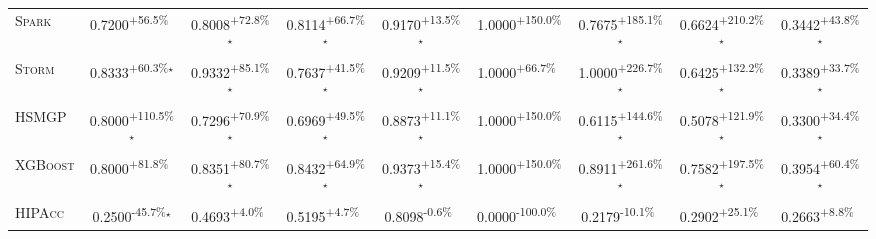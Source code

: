 \begin{table}[htbp]
\begin{tabular}{l|cccc|cccc}
\textsc{Spark} & \cellcolor{green!30}0.7200\textsuperscript{+56.5\%}$^{\,\,\,}$ & \cellcolor{green!30}0.8008\textsuperscript{+72.8\%}$^\star$ & \cellcolor{green!30}0.8114\textsuperscript{+66.7\%}$^\star$ & \cellcolor{green!30}0.9170\textsuperscript{+13.5\%}$^\star$ & \cellcolor{green!30}1.0000\textsuperscript{+150.0\%}$^{\,\,\,}$ & \cellcolor{green!30}0.7675\textsuperscript{+185.1\%}$^\star$ & \cellcolor{green!30}0.6624\textsuperscript{+210.2\%}$^\star$ & \cellcolor{green!30}0.3442\textsuperscript{+43.8\%}$^\star$ \\
\textsc{Storm} & \cellcolor{green!30}0.8333\textsuperscript{+60.3\%}$^\star$ & \cellcolor{green!30}0.9332\textsuperscript{+85.1\%}$^\star$ & \cellcolor{green!30}0.7637\textsuperscript{+41.5\%}$^\star$ & \cellcolor{green!30}0.9209\textsuperscript{+11.5\%}$^\star$ & \cellcolor{green!30}1.0000\textsuperscript{+66.7\%}$^{\,\,\,}$ & \cellcolor{green!30}1.0000\textsuperscript{+226.7\%}$^\star$ & \cellcolor{green!30}0.6425\textsuperscript{+132.2\%}$^\star$ & \cellcolor{green!30}0.3389\textsuperscript{+33.7\%}$^\star$ \\
\textsc{HSMGP} & \cellcolor{green!30}0.8000\textsuperscript{+110.5\%}$^\star$ & \cellcolor{green!30}0.7296\textsuperscript{+70.9\%}$^\star$ & \cellcolor{green!30}0.6969\textsuperscript{+49.5\%}$^\star$ & \cellcolor{green!30}0.8873\textsuperscript{+11.1\%}$^\star$ & \cellcolor{green!30}1.0000\textsuperscript{+150.0\%}$^{\,\,\,}$ & \cellcolor{green!30}0.6115\textsuperscript{+144.6\%}$^\star$ & \cellcolor{green!30}0.5078\textsuperscript{+121.9\%}$^\star$ & \cellcolor{green!30}0.3300\textsuperscript{+34.4\%}$^\star$ \\
\textsc{XGBoost} & \cellcolor{green!30}0.8000\textsuperscript{+81.8\%}$^{\,\,\,}$ & \cellcolor{green!30}0.8351\textsuperscript{+80.7\%}$^\star$ & \cellcolor{green!30}0.8432\textsuperscript{+64.9\%}$^\star$ & \cellcolor{green!30}0.9373\textsuperscript{+15.4\%}$^\star$ & \cellcolor{green!30}1.0000\textsuperscript{+150.0\%}$^{\,\,\,}$ & \cellcolor{green!30}0.8911\textsuperscript{+261.6\%}$^\star$ & \cellcolor{green!30}0.7582\textsuperscript{+197.5\%}$^\star$ & \cellcolor{green!30}0.3954\textsuperscript{+60.4\%}$^\star$ \\
\textsc{HIPAcc} & \cellcolor{red!30}0.2500\textsuperscript{-45.7\%}$^\star$ & \cellcolor{green!30}0.4693\textsuperscript{+4.0\%}$^{\,\,\,}$ & \cellcolor{green!30}0.5195\textsuperscript{+4.7\%}$^{\,\,\,}$ & \cellcolor{red!30}0.8098\textsuperscript{-0.6\%}$^{\,\,\,}$ & \cellcolor{red!30}0.0000\textsuperscript{-100.0\%}$^{\,\,\,}$ & \cellcolor{red!30}0.2179\textsuperscript{-10.1\%}$^{\,\,\,}$ & \cellcolor{green!30}0.2902\textsuperscript{+25.1\%}$^{\,\,\,}$ & \cellcolor{green!30}0.2663\textsuperscript{+8.8\%}$^{\,\,\,}$ \\

\end{tabular}
\end{table}
